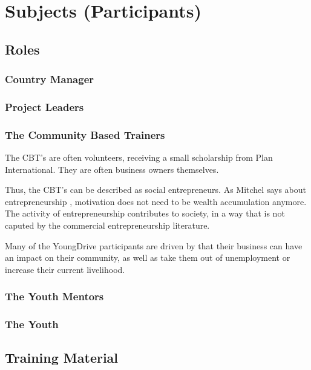 \section{Subjects (Participants)}

\subsection{Roles}

\subsubsection{Country Manager}

\subsubsection{Project Leaders}

\subsubsection{The Community Based Trainers}

The CBT's are often volunteers, receiving a small scholarship from Plan International. They are often business owners themselves.

Thus, the CBT's can be described as social entrepreneurs. As Mitchel says about entrepreneurship \citep{mitchel}, motivation does not need to be wealth accumulation anymore. The activity of entrepreneurship contributes to society, in a way that is not caputed by the commercial entrepreneurship literature.

Many of the YoungDrive participants are driven by that their business can have an impact on their community, as well as take them out of unemployment or increase their current livelihood.

\subsubsection{The Youth Mentors}


\subsubsection{The Youth}


\subsection{Training Material}

